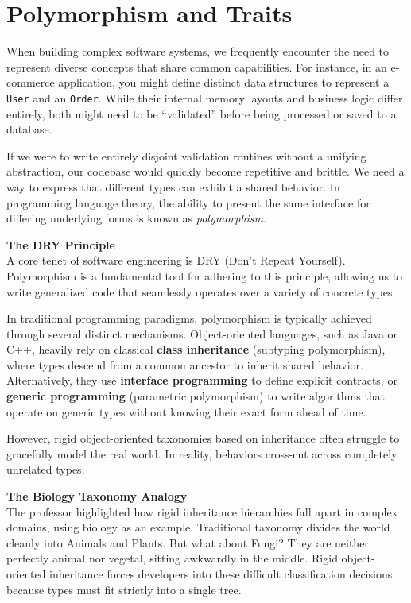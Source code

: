 \chapter{Polymorphism and Traits}

When building complex software systems, we frequently encounter the need to represent diverse concepts that share common capabilities. For instance, in an e-commerce application, you might define distinct data structures to represent a \texttt{User} and an \texttt{Order}. While their internal memory layouts and business logic differ entirely, both might need to be ``validated'' before being processed or saved to a database. 

If we were to write entirely disjoint validation routines without a unifying abstraction, our codebase would quickly become repetitive and brittle. We need a way to express that different types can exhibit a shared behavior. In programming language theory, the ability to present the same interface for differing underlying forms is known as \textit{polymorphism}. 

\begin{notebox}
\textbf{The DRY Principle} \\
A core tenet of software engineering is DRY (Don't Repeat Yourself). Polymorphism is a fundamental tool for adhering to this principle, allowing us to write generalized code that seamlessly operates over a variety of concrete types.
\end{notebox}

In traditional programming paradigms, polymorphism is typically achieved through several distinct mechanisms. Object-oriented languages, such as Java or C++, heavily rely on classical \textbf{class inheritance} (subtyping polymorphism), where types descend from a common ancestor to inherit shared behavior. Alternatively, they use \textbf{interface programming} to define explicit contracts, or \textbf{generic programming} (parametric polymorphism) to write algorithms that operate on generic types without knowing their exact form ahead of time.

However, rigid object-oriented taxonomies based on inheritance often struggle to gracefully model the real world. In reality, behaviors cross-cut across completely unrelated types. 

\begin{insightbox}
\textbf{The Biology Taxonomy Analogy} \\
The professor highlighted how rigid inheritance hierarchies fall apart in complex domains, using biology as an example. Traditional taxonomy divides the world cleanly into Animals and Plants. But what about Fungi? They are neither perfectly animal nor vegetal, sitting awkwardly in the middle. Rigid object-oriented inheritance forces developers into these difficult classification decisions because types must fit strictly into a single tree.
\end{insightbox}

